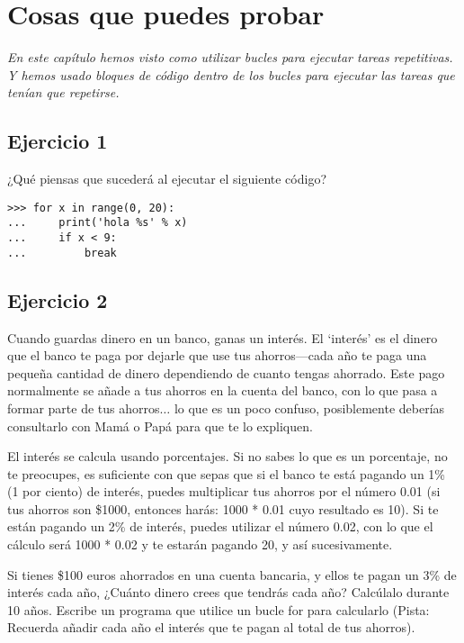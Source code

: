 \section{Cosas que puedes probar}

\emph{En este capítulo hemos visto como utilizar bucles para ejecutar tareas repetitivas.  Y hemos usado bloques de código dentro de los bucles para ejecutar las tareas que tenían que repetirse.}

\subsection*{Ejercicio 1}
¿Qué piensas que sucederá al ejecutar el siguiente código?

\begin{listing}
\begin{verbatim}
>>> for x in range(0, 20):
...     print('hola %s' % x)
...     if x < 9:
...         break
\end{verbatim}
\end{listing}

\subsection*{Ejercicio 2}
Cuando guardas dinero en un banco, ganas un interés.  El `interés' es el dinero que el banco te paga por dejarle que use tus ahorros---cada año te paga una pequeña cantidad de dinero dependiendo de cuanto tengas ahorrado.  Este pago normalmente se añade a tus ahorros en la cuenta del banco, con lo que pasa a formar parte de tus ahorros$\ldots$ lo que es un poco confuso, posiblemente deberías consultarlo con Mamá o Papá para que te lo expliquen.

El interés se calcula usando porcentajes.  Si no sabes lo que es un porcentaje, no te preocupes, es suficiente con que sepas que si el banco te está pagando un 1\% (1 por ciento) de interés, puedes multiplicar tus ahorros por el número 0.01 (si tus ahorros son \$1000, entonces harás: 1000 * 0.01 cuyo resultado es 10). Si te están pagando un 2\% de interés, puedes utilizar el número 0.02, con lo que el cálculo será 1000 * 0.02 y te estarán pagando 20, y así sucesivamente.

Si tienes \$100 euros ahorrados en una cuenta bancaria, y ellos te pagan un 3\% de interés cada año, ¿Cuánto dinero crees que tendrás cada año? Calcúlalo durante 10 años. Escribe un programa que utilice un bucle for para calcularlo (Pista: Recuerda añadir cada año el interés que te pagan al total de tus ahorros). 
\newpage
